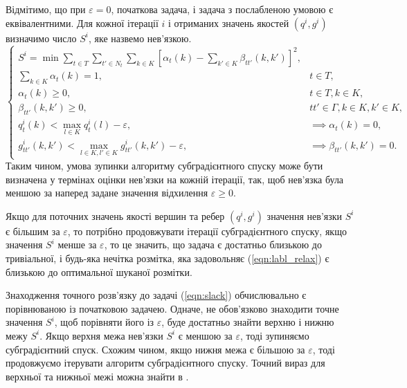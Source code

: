 Відмітимо, що при $\varepsilon=0$, початкова задача, і задача з послабленою умовою
є еквівалентними.
Для кожної ітерації $i$ і отриманих значень якостей $(q^i,g^i)$ визначимо 
число $S^i$, яке назвемо нев'язкою.
\begin{equation}
    \label{eqn:slack}
    \begin{cases}
      S^i = \min\sum\limits_{t\in T}\sum\limits_{t'\in N_t}\sum\limits_{k\in K}\left[\alpha_t(k)-\sum\limits_{k' \in K} \beta_{tt'}(k,k')\right]^2,\\
      \sum\limits_{k \in K} \alpha_t(k)=1, & t\in T,\\
      \alpha_t(k)\geq 0, & t\in T, k\in K,\\
      \beta_{tt'}(k,k')\geq 0, & tt'\in \Gamma, k\in K, k'\in K,\\
      q^i_t(k)<\max\limits_{l\in K}q^i_t(l)-\varepsilon, & \implies\alpha_t(k)=0,\\
      g^i_{tt'}(k,k')< \max\limits_{l\in K, l'\in K}g^i_{tt'}(k,k')-\varepsilon, & \implies \beta_{tt'}(k,k')=0.
    \end{cases}
  \end{equation}
Таким чином, умова зупинки алгоритму субградієнтного спуску може бути визначена у термінах 
оцінки нев'язки на кожній ітерації, так, щоб нев'язка була меншою за наперед задане 
значення відхилення $\varepsilon\geq0$.

Якщо для поточних значень якості вершин та ребер $(q^i, g^i)$ значення нев'язки $S^i$ є більшим
за $\varepsilon$, то потрібно продовжувати ітерації субградієнтного спуску, якщо значення $S^i$
менше за $\varepsilon$, то це значить, що задача є достатньо близькою до тривіальної, 
і будь-яка нечітка розмітка, яка задовольняє (\ref{eqn:labl_relax}) є близькою до 
оптимальної шуканої розмітки.

Знаходження точного розв’язку до задачі (\ref{eqn:slack}) обчислювально є порівнюваною із початковою
задачею. Одначе, не обов'язково знаходити точне значення $S^i$, щоб порівняти його із $\varepsilon$, буде
достатньо знайти верхню і нижню межу $S^i$. Якщо верхня межа нев'язки $S^i$ є 
меншою за $\varepsilon$, тоді зупиняємо субградієнтний спуск. Схожим чином, якщо 
нижня межа є більшою за $\varepsilon$, тоді продовжуємо ітерувати алгоритм субградієнтного спуску.
Точний вираз для верхньої та нижньої межі можна знайти в \cite{lopatka_stop_cond}.